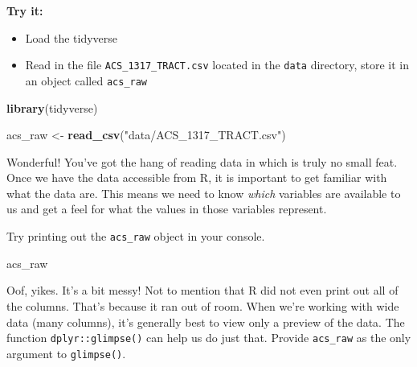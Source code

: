 \documentclass[
]{book}
\newenvironment{Shaded}{\begin{snugshade}}{\end{snugshade}}
\newcommand{\KeywordTok}[1]{\textcolor[rgb]{0.13,0.29,0.53}{\textbf{#1}}}
\newcommand{\NormalTok}[1]{#1}
\newcommand{\StringTok}[1]{\textcolor[rgb]{0.31,0.60,0.02}{#1}}
\providecommand{\tightlist}{%
  \setlength{\itemsep}{0pt}\setlength{\parskip}{0pt}}
\begin{document}
\textbf{Try it:}

\begin{itemize}
\tightlist
\item
  Load the tidyverse
\item
  Read in the file \texttt{ACS\_1317\_TRACT.csv} located in the \texttt{data} directory, store it in an object called \texttt{acs\_raw}
\end{itemize}

\begin{Shaded}
\begin{Highlighting}[]
\KeywordTok{library}\NormalTok{(tidyverse)}

\NormalTok{acs\_raw \textless{}{-}}\StringTok{ }\KeywordTok{read\_csv}\NormalTok{(}\StringTok{"data/ACS\_1317\_TRACT.csv"}\NormalTok{)}
\end{Highlighting}
\end{Shaded}

Wonderful! You've got the hang of reading data in which is truly no small feat. Once we have the data accessible from R, it is important to get familiar with what the data are. This means we need to know \emph{which} variables are available to us and get a feel for what the values in those variables represent.

Try printing out the \texttt{acs\_raw} object in your console.

\begin{Shaded}
\begin{Highlighting}[]
\NormalTok{acs\_raw}
\end{Highlighting}
\end{Shaded}

Oof, yikes. It's a bit messy! Not to mention that R did not even print out all of the columns. That's because it ran out of room. When we're working with wide data (many columns), it's generally best to view only a preview of the data. The function \texttt{dplyr::glimpse()} can help us do just that. Provide \texttt{acs\_raw} as the only argument to \texttt{glimpse()}.
\end{document}

